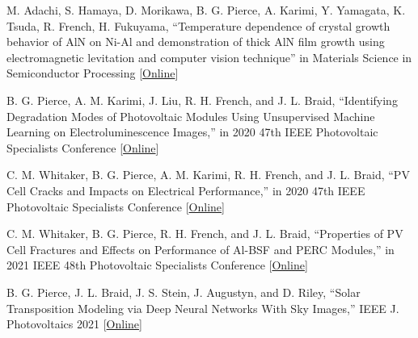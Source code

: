 \documentclass[10pt]{article}
\begin{document}
	{\begin{newitemize}
    
    
    
    
    \item{M. Adachi, S. Hamaya, D. Morikawa, { B. G. Pierce}, A. Karimi, Y. Yamagata, K. Tsuda, R. French,  H. Fukuyama, ``Temperature dependence of crystal growth behavior of AlN on Ni-Al and demonstration of thick AlN film growth using electromagnetic levitation and computer vision technique'' in Materials Science in Semiconductor Processing [\href{https://www.sciencedirect.com/science/article/pii/S136980012200693X}{Online}] }
    
    
    \item {{ B. G. Pierce}, A. M. Karimi, J. Liu, R. H. French, and J. L. Braid, ``Identifying Degradation Modes of Photovoltaic Modules Using Unsupervised Machine Learning on Electroluminescence Images,'' in 2020 47th IEEE Photovoltaic Specialists Conference [\href{https://ieeexplore.ieee.org/abstract/document/9301021}{Online}] }
    
    
    \item{C. M. Whitaker, { B. G. Pierce}, A. M. Karimi, R. H. French, and J. L. Braid, ``PV Cell Cracks and Impacts on Electrical Performance,'' in 2020 47th IEEE Photovoltaic Specialists Conference [\href{https://ieeexplore.ieee.org/abstract/document/9300374}{Online}] } 
    
    
    \item{C. M. Whitaker, { B. G. Pierce}, R. H. French, and J. L. Braid, ``Properties of PV Cell Fractures and Effects on Performance of Al-BSF and PERC Modules,” in 2021 IEEE 48th Photovoltaic Specialists Conference [\href{https://ieeexplore.ieee.org/abstract/document/9519030}{Online}] }
    
    \item{{ B. G. Pierce}, J. L. Braid, J. S. Stein, J. Augustyn, and D. Riley, ``Solar Transposition Modeling via Deep Neural Networks With Sky Images,” IEEE J. Photovoltaics 2021 [\href{https://ieeexplore.ieee.org/abstract/document/9623380}{Online}] }
    
%    
    

\end{newitemize}}
\end{document}
